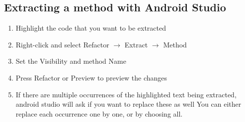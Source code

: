 \documentclass[]{article}
\begin{document}
\subsection{Extracting a method with Android Studio}
\begin{enumerate}
	\item  Highlight the code that you want to be extracted
	\item Right-click and select Refactor $\rightarrow$ Extract $\rightarrow$ Method
	\item Set the Visibility and method Name 
	\item Press Refactor or Preview to preview the changes
	\item If there are multiple occurrences of the highlighted text being extracted, android studio will ask if you want to replace these as well 
	\subitem You can either replace each occurrence one by one, or by choosing all.
\end{enumerate}
\end{document}
